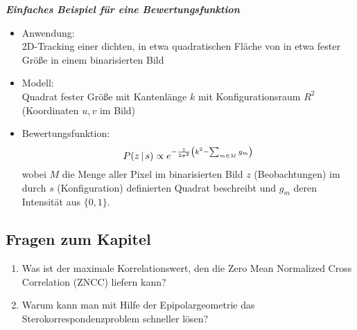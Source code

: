 \textbf{\textsl{Einfaches Beispiel für eine Bewertungsfunktion}}

\begin{itemize}
\item Anwendung: \\ 2D-Tracking einer dichten, in etwa quadratischen Fläche von in etwa fester Größe in einem binarisierten Bild
\item Modell: \\ Quadrat fester Größe mit Kantenlänge $k$ mit Konfigurationsraum $R^2$ (Koordinaten $u,v$ im Bild)
\item Bewertungsfunktion: $$P(z \, | \, s) \propto e^{- \frac{1}{2 \sigma^2} \left( k^2 - \sum_{m \in M} g_m \right)}$$ wobei $M$ die Menge aller Pixel im binarisierten Bild $z$ (Beobachtungen) im durch $s$ (Konfiguration) definierten Quadrat beschreibt und $g_m$ deren Intensität aus $\{0,1\}$.
\end{itemize}

\subsection{Fragen zum Kapitel}
\begin{enumerate}
	\item Was ist der maximale Korrelationswert, den die Zero Mean Normalized Cross Correlation (ZNCC) liefern kann?
	\item Warum kann man mit Hilfe der Epipolargeometrie das Sterokorrespondenzproblem schneller lösen?
\end{enumerate}








